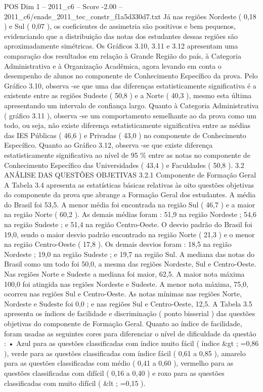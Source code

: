 \begin{textsample}{POS Dim 1 – 2011\_c6 – Score -2.00 – 2011\_c6/enade\_2011\_tec\_constr\_f1a5d330d7.txt}
Já nas regiões Nordeste ( 0,18 ) e Sul ( 0,07 ), os coeficientes de assimetria são positivos e bem pequenos, evidenciando que a distribuição das notas dos estudantes dessas regiões são aproximadamente simétricas.
Os Gráficos 3.10, 3.11 e 3.12 apresentam uma comparação dos resultados em relação à Grande Região do país, à Categoria Administrativa e à Organização Acadêmica, agora levando em conta o desempenho de alunos no componente de Conhecimento Específico da prova.
Pelo Gráfico 3.10, observa -se que uma das diferenças estatisticamente significativa é a existente entre as regiões Sudeste ( 50,8 ) e a Norte ( 40,3 ), mesmo esta última apresentando um intervalo de confiança largo.
Quanto à Categoria Administrativa ( gráfico 3.11 ), observa -se um comportamento semelhante ao da prova como um todo, ou seja, não existe diferença estatisticamente significativa entre as médias das IES Públicas ( 46,6 ) e Privadas ( 43,0 ) no componente de Conhecimento Específico.
Quanto ao Gráfico 3.12, observa -se que existe diferença estatisticamente significativa ao nível de 95 \% entre as notas no componente de Conhecimento Específico das Universidades ( 43,4 ) e Faculdades ( 50,8 ). 3.2 ANÁLISE DAS QUESTÕES OBJETIVAS 3.2.1 Componente de Formação Geral A Tabela 3.4 apresenta as estatísticas básicas relativas às oito questões objetivas do componente da prova que abrange a Formação Geral dos estudantes.
A média do Brasil foi 53,5.
A menor média foi encontrada na região Sul ( 46,7 ) e a maior na região Norte ( 60,2 ).
As demais médias foram : 51,9 na região Nordeste ; 54,6 na região Sudeste ; e 51,4 na região Centro-Oeste.
O desvio padrão do Brasil foi 19,0, sendo o maior desvio padrão encontrado na região Norte ( 21,3 ) e o menor na região Centro-Oeste ( 17,8 ).
Os demais desvios foram : 18,5 na região Nordeste ; 19,0 na região Sudeste ; e 19,7 na região Sul.
A mediana das notas do Brasil como um todo foi 50,0, a mesma das regiões Nordeste, Sul e Centro-Oeste.
Nas regiões Norte e Sudeste a mediana foi maior, 62,5.
A maior nota máxima 100,0 foi atingida nas regiões Nordeste e Sudeste.
A menor nota máxima, 75,0, ocorreu nas regiões Sul e Centro-Oeste.
As notas mínimas nas regiões Norte, Nordeste e Sudeste foi 0,0 ; e nas regiões Sul e Centro-Oeste, 12,5.
A Tabela 3.5 apresenta os índices de facilidade e discriminação ( ponto bisserial ) das questões objetivas do componente de Formação Geral.
Quanto ao índice de facilidade, foram usadas as seguintes cores para diferenciar o nível de dificuldade da questão : • Azul para as questões classificadas com índice muito fácil ( índice \&gt ; =0,86 ), verde para as questões classificadas com índice fácil ( 0,61 a 0,85 ), amarelo para as questões classificadas com médio ( 0,41 a 0,60 ), vermelho para as questões classificadas com difícil ( 0,16 a 0,40 ) e roxo para as questões classificadas com muito difícil ( \&lt ; =0,15 ).

\end{textsample}
